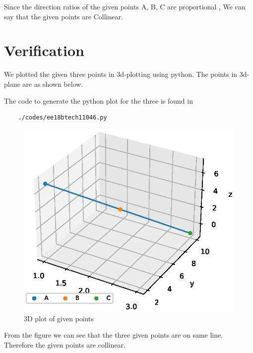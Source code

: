 \documentclass[journal,12pt,twocolumn]{IEEEtran}
\begin{document}
Since the direction ratios of the given points A, B, C are proportional
, We can say that the given points are Collinear.

\section{Verification}

We plotted the given three points in 3d-plotting using python.
The points in 3d-plane are as shown below.

The code to generate the python plot for the three is
found in
\begin{lstlisting}
    ./codes/ee18btech11046.py
\end{lstlisting}

\begin{figure}[!ht]
    \centering
    \includegraphics[width=\columnwidth]{./figs/ee18btech11046.eps}
    \caption{3D plot of given points}
    \label{fig:3Dplot}
\end{figure}

From the figure we can see that the three given points are on same line.
Therefore the given points are collinear.
\end{document}
